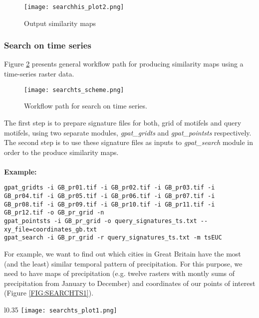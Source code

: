 \begin{figure}[H]
	\centering
	\texttt{[image: searchhis\_plot2.png]}
	\caption{Output similarity maps}
	\label{FIG:SEARCH2}
\end{figure}

\FloatBarrier

\subsubsection{Search on time series}
Figure \ref{FIG:SEARCHTS} presents general workflow path for producing similarity maps using a time-series raster data. 

\begin{figure}[H]
	\centering
	\texttt{[image: searchts\_scheme.png]}
	\caption{Workflow path for search on time series.}
	\label{FIG:SEARCHTS}
\end{figure}

The first step is to prepare signature files for both, grid of motifels and query motifels, using two separate modules, {\it gpat\_gridts} and {\it gpat\_pointsts} respectively. 
The second step is to use these signature files as inputs to {\it gpat\_search} module in order to the produce similarity maps.\\\\

{\bf Example:}

\begin{minipage}{\linewidth}
\begin{lstlisting}
gpat_gridts -i GB_pr01.tif -i GB_pr02.tif -i GB_pr03.tif -i GB_pr04.tif -i GB_pr05.tif -i GB_pr06.tif -i GB_pr07.tif -i GB_pr08.tif -i GB_pr09.tif -i GB_pr10.tif -i GB_pr11.tif -i GB_pr12.tif -o GB_pr_grid -n
gpat_pointsts -i GB_pr_grid -o query_signatures_ts.txt --xy_file=coordinates_gb.txt
gpat_search -i GB_pr_grid -r query_signatures_ts.txt -m tsEUC
\end{lstlisting}
\end{minipage}

For example, we want to find out which cities in Great Britain have the most (and the least) similar temporal pattern of precipitation. 
For this purpose, we need to have maps of precipitation (e.g. twelve rasters with montly sums of precipitation from January to December) and coordinates of our points of interest (Figure \ref{FIG:SEARCHTS1}).

\newpage

\begin{wrapfigure}{l}{0.35\textwidth}
	\texttt{[image: searchts\_plot1.png]}
	\caption{Location of the points of interest}
	\label{FIG:SEARCHTS1}
\end{wrapfigure}

